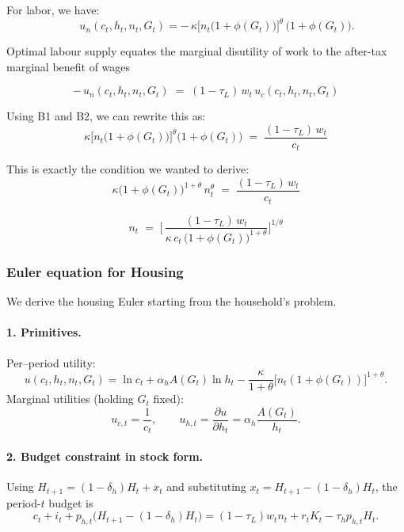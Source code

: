 For labor, we have:
\begin{equation*}
\qquad
u_n(c_t,h_t,n_t,G_t)=-\,\kappa\bigl[n_t\bigl(1+\phi(G_t)\bigr)\bigr]^{\theta}\,\bigl(1+\phi(G_t)\bigr). \tag{B2}
\end{equation*}

Optimal labour supply equates the marginal disutility of work to the after-tax marginal benefit of wages

\begin{equation*}
-\,u_n(c_t,h_t,n_t,G_t) \;=\;(1-\tau_L)\,w_t\,u_c(c_t,h_t,n_t,G_t) 
\end{equation*}

Using B1 and B2, we can rewrite this as:
\begin{equation*}
\kappa\bigl[n_t\bigl(1+\phi(G_t)\bigr)\bigr]^{\theta}\bigl(1+\phi(G_t)\bigr)
    \;=\;\frac{(1-\tau_L)\,w_t}{c_t}
\end{equation*}

This is exactly the condition we wanted to derive:
\begin{equation*}
\kappa\bigl(1+\phi(G_t)\bigr)^{1+\theta}\,n_t^{\theta}
      \;=\;\frac{(1-\tau_L)\,w_t}{c_t} 
\end{equation*}

\begin{equation*}
        n_t \;=\;\Biggl[\,
        \frac{(1-\tau_L)\,w_t}
            {\kappa\,c_t\,\bigl(1+\phi(G_t)\bigr)^{1+\theta}}
        \Biggr]^{\!1/\theta}\!
\end{equation*}

\subsubsection{Euler equation for Housing}

We derive the housing Euler starting from the household’s problem.

\paragraph{1. Primitives.}
Per–period utility:
\[
u(c_t,h_t,n_t,G_t)=\ln c_t + \alpha_h A(G_t)\ln h_t - \frac{\kappa}{1+\theta}\bigl[n_t(1+\phi(G_t))\bigr]^{1+\theta}.
\]
Marginal utilities (holding $G_t$ fixed):
\[
u_{c,t}=\frac{1}{c_t},\qquad
u_{h,t}=\frac{\partial u}{\partial h_t}=\alpha_h \frac{A(G_t)}{h_t}.
\]

\paragraph{2. Budget constraint in stock form.}
Using $H_{t+1}=(1-\delta_h)H_t + x_t$ and substituting $x_t=H_{t+1}-(1-\delta_h)H_t$, the period-$t$ budget is
\[
c_t + i_t + p_{h,t}\bigl(H_{t+1}-(1-\delta_h)H_t\bigr)
= (1-\tau_L)w_t n_t + r_t K_t - \tau_h p_{h,t} H_t.
\]

